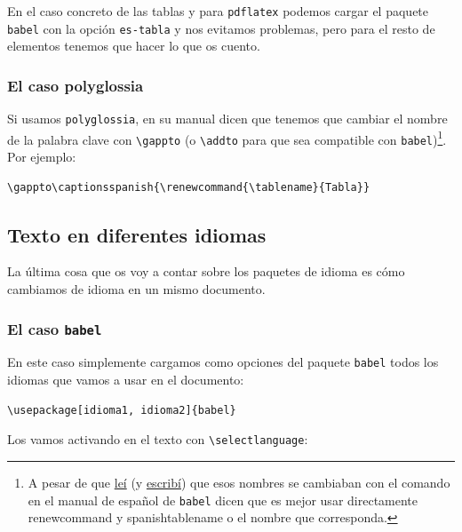 En el caso concreto de las tablas y para \lstinline!pdflatex! podemos cargar el
paquete \lstinline!babel! con la opción \lstinline!es-tabla! y nos evitamos problemas, pero para
el resto de elementos tenemos que hacer lo que os cuento.

\subsubsection{El caso polyglossia}

Si usamos \lstinline!polyglossia!, en su manual dicen que tenemos que cambiar el
nombre de la palabra clave con \lstinline!\gappto! (o \lstinline!\addto! para que sea compatible
con \lstinline!babel!)\footnote{A pesar de que \href{http://tex.stackexchange.com/questions/82993/how-to-change-the-name-of-document-elements-like-figure-contents-bibliogr}{leí} 
(y \href{https://ondahostil.wordpress.com/2017/02/09/lo-que-he-aprendido-establecer-el-idioma-para-xelatex/}{escribí}) que esos nombres se cambiaban
con el comando \texttt{\addto} en el manual de español de \lstinline!babel! dicen que es
mejor usar directamente renewcommand y spanishtablename o el nombre que corresponda.}. Por ejemplo:

\begin{lstlisting}[language={[latex]tex}]
\gappto\captionsspanish{\renewcommand{\tablename}{Tabla}}
\end{lstlisting}

\subsection{Texto en diferentes idiomas}\label{texto-en-diferentes-idiomas}

La última cosa que os voy a contar sobre los paquetes de idioma es cómo
cambiamos de idioma en un mismo documento.

\subsubsection{El caso \texttt{babel}}

En este caso simplemente cargamos como opciones del paquete \lstinline!babel! todos
los idiomas que vamos a usar en el documento:

\begin{lstlisting}[language={[latex]tex}]
\usepackage[idioma1, idioma2]{babel}
\end{lstlisting}

Los vamos activando en el texto con \lstinline!\selectlanguage!:

